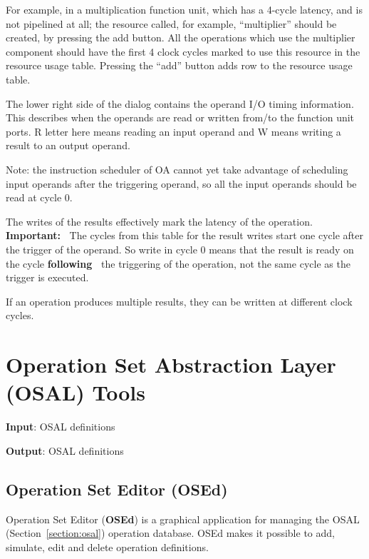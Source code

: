 \documentclass[a4paper,twoside]{tceusermanual}
\begin{document}
For example, in a multiplication function unit, which has a 4-cycle latency,
and is not pipelined at all; the resource called, for example, ``multiplier'' 
should be created, by pressing the add button. All the operations which use the 
multiplier component should have the first 4 clock cycles marked to use this 
resource in the resource usage table. Pressing the ``add'' button adds row to 
the resource usage table.

The lower right side of the dialog contains the operand I/O timing information.
This describes when the operands are read or written from/to the function unit
ports. R letter here means reading an input operand and W means writing a result to 
an output operand.

Note: the instruction scheduler of OA cannot yet take advantage of scheduling 
input operands after the triggering operand, so all the input operands should be 
read at cycle 0.


The writes of the results effectively mark the latency of the operation.
\textbf{Important:\ }
The cycles from this table for the result writes start one cycle after the
trigger of the operand. So write in cycle 0 means that the result is ready
on the cycle \textbf{following\ } the triggering of the operation, 
not the same cycle as the trigger is executed.

If an operation produces multiple results, they can be written at different
clock cycles.

\section{Operation Set Abstraction Layer (OSAL) Tools}
\label{sec:osalTools}

 
\textbf{Input}: OSAL definitions 

\textbf{Output}: OSAL definitions

\subsection{Operation Set Editor (OSEd)}
\label{sec:osed}

Operation Set Editor (\textbf{OSEd}) is a graphical application for managing
the OSAL (Section~\ref{section:osal}) operation database. OSEd makes it possible
to add, simulate, edit and delete operation definitions. 
\end{document}
